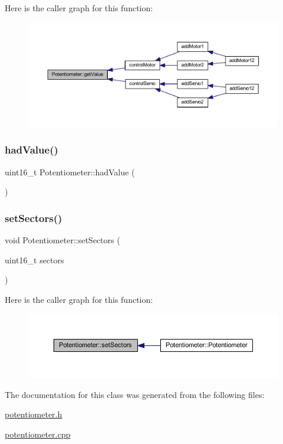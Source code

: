 Here is the caller graph for this function\+:\nopagebreak
\begin{figure}[H]
\begin{center}
\leavevmode
\includegraphics[width=350pt]{class_potentiometer_ac992f846228fddede6d86d6ffa1be9b6_icgraph}
\end{center}
\end{figure}
\mbox{\label{class_potentiometer_ad14725e0c1809d03c7a9f808408ed601}} 
\subsubsection{\texorpdfstring{had\+Value()}{hadValue()}}
{\footnotesize\ttfamily uint16\+\_\+t Potentiometer\+::had\+Value (\begin{DoxyParamCaption}{ }\end{DoxyParamCaption})}

\mbox{\label{class_potentiometer_ac7b48ed37eb525ff4f8d21899c0a7053}} 
\subsubsection{\texorpdfstring{set\+Sectors()}{setSectors()}}
{\footnotesize\ttfamily void Potentiometer\+::set\+Sectors (\begin{DoxyParamCaption}\item[{uint16\+\_\+t}]{sectors }\end{DoxyParamCaption})}

Here is the caller graph for this function\+:\nopagebreak
\begin{figure}[H]
\begin{center}
\leavevmode
\includegraphics[width=350pt]{class_potentiometer_ac7b48ed37eb525ff4f8d21899c0a7053_icgraph}
\end{center}
\end{figure}


The documentation for this class was generated from the following files\+:\begin{DoxyCompactItemize}
\item 
\hyperlink{potentiometer_8h}{potentiometer.\+h}\item 
\hyperlink{potentiometer_8cpp}{potentiometer.\+cpp}\end{DoxyCompactItemize}
